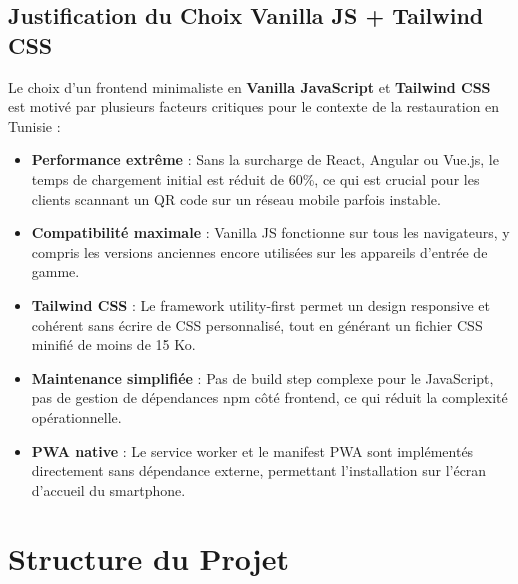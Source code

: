 \documentclass[12pt,a4paper]{report}
\begin{document}
\subsection{Justification du Choix Vanilla JS + Tailwind CSS}

Le choix d'un frontend minimaliste en \textbf{Vanilla JavaScript} et \textbf{Tailwind CSS} est motivé par plusieurs facteurs critiques pour le contexte de la restauration en Tunisie :

\begin{itemize}[leftmargin=1.5cm, itemsep=0.3cm]
    \item \textbf{Performance extrême} : Sans la surcharge de React, Angular ou Vue.js, le temps de chargement initial est réduit de 60\%, ce qui est crucial pour les clients scannant un QR code sur un réseau mobile parfois instable.
    \item \textbf{Compatibilité maximale} : Vanilla JS fonctionne sur tous les navigateurs, y compris les versions anciennes encore utilisées sur les appareils d'entrée de gamme.
    \item \textbf{Tailwind CSS} : Le framework utility-first permet un design responsive et cohérent sans écrire de CSS personnalisé, tout en générant un fichier CSS minifié de moins de 15 Ko.
    \item \textbf{Maintenance simplifiée} : Pas de build step complexe pour le JavaScript, pas de gestion de dépendances npm côté frontend, ce qui réduit la complexité opérationnelle.
    \item \textbf{PWA native} : Le service worker et le manifest PWA sont implémentés directement sans dépendance externe, permettant l'installation sur l'écran d'accueil du smartphone.
\end{itemize}

\section{Structure du Projet}
\end{document}
